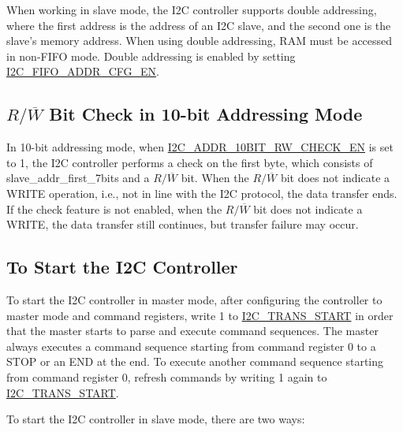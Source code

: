 \documentclass[main\_\_EN.tex]{subfiles}
\begin{document}
When working in slave mode, the I2C controller supports double addressing, where the first address is the address of an I2C slave, and the second one is the slave's memory address. When using double addressing, RAM must be accessed in non-FIFO mode. Double addressing is enabled by setting \hyperref[fielddesc:I2CFIFOADDRCFGEN]{I2C\_FIFO\_ADDR\_CFG\_EN}.

\subsection{\texorpdfstring{$R/\overline W$ Bit Check in 10-bit Addressing Mode}{R/W Bit Check in 10-bit Addressing Mode}}
In 10-bit addressing mode, when \hyperref[fielddesc:I2CADDR10BITRWCHECKEN]{I2C\_ADDR\_10BIT\_RW\_CHECK\_EN} is set to 1, the I2C controller performs a check on the first byte, which consists of slave\_addr\_first\_7bits and a $R/\overline W$ bit. When the $R/\overline W$ bit does not indicate a WRITE operation, i.e., not in line with the I2C protocol, the data transfer ends. If the check feature is not enabled, when the $R/\overline W$ bit does not indicate a WRITE, the data transfer still continues, but transfer failure may occur.

\subsection{To Start the I2C Controller}\label{subsubsec:i2c-start}
To start the I2C controller in master mode, after configuring the controller to master mode and command registers, write 1 to \hyperref[fielddesc:I2CTRANSSTART]{I2C\_TRANS\_START} in order that the master starts to parse and execute command sequences. The master always executes a command sequence starting from command register 0 to a STOP or an END at the end. To execute another command sequence starting from command register 0, refresh commands by writing 1 again to \hyperref[fielddesc:I2CTRANSSTART]{I2C\_TRANS\_START}.

To start the I2C controller in slave mode, there are two ways:
\end{document}
